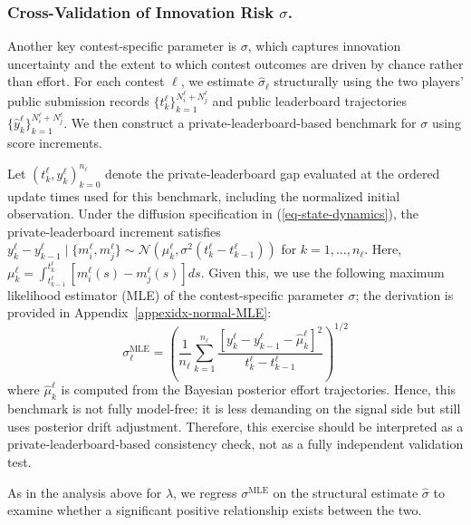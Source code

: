 \documentclass[mnsc]{informs3}
\begin{document}
\subsubsection{Cross-Validation of Innovation Risk $\sigma$.}
Another key contest-specific parameter is $\sigma$, which captures innovation uncertainty and the extent to which contest outcomes are driven by chance rather than effort.
For each contest $\ell$, we estimate $\hat{\sigma}_\ell$ structurally using the two players’ public submission records $\{t_k^\ell\}_{k=1}^{N_i^\ell+N_j^\ell}$ and public leaderboard trajectories $\{\hat y_k^\ell\}_{k=1}^{N_i^\ell+N_j^\ell}$.
We then construct a private-leaderboard-based benchmark for $\sigma$ using score increments.

Let $(t^\ell_k,y^\ell_k)_{k=0}^{n_\ell}$ denote the private-leaderboard gap evaluated at the ordered update times used for this benchmark, including the normalized initial observation.
Under the diffusion specification in (\ref{eq-state-dynamics}), the private-leaderboard increment satisfies
$y^\ell_{k} - y^\ell_{k-1} \mid \{m_i^\ell,m_j^\ell\} \sim \mathcal{N}\left(\mu^\ell_k, \sigma^2(t^\ell_k-t^\ell_{k-1})\right)$ for $k=1,\ldots,n_\ell$.
Here, $\mu^\ell_k = \int^{t^\ell_k}_{t^\ell_{k-1}}\left[m^\ell_i(s) - m^\ell_j(s)\right]ds$.
Given this, we use the following maximum likelihood estimator (MLE) of the contest-specific parameter $\sigma$; the derivation is provided in Appendix~\ref{appexidx-normal-MLE}:
\begin{equation*}
\sigma^{\text{MLE}}_\ell = \left(\frac{1}{n_\ell}\sum_{k=1}^{n_\ell}\frac{\left[y^\ell_k-y^\ell_{k-1}-\hat\mu^\ell_k\right]^2}{t^\ell_k-t^\ell_{k-1}}\right)^{1/2}
\end{equation*}
where $\hat\mu^\ell_k$ is computed from the Bayesian posterior effort trajectories.
Hence, this benchmark is not fully model-free: it is less demanding on the signal side but still uses posterior drift adjustment.
Therefore, this exercise should be interpreted as a private-leaderboard-based consistency check, not as a fully independent validation test.

As in the analysis above for $\lambda$, we regress $\sigma^{\text{MLE}}$ on the structural estimate $\hat{\sigma}$ to examine whether a significant positive relationship exists between the two.
\end{document}
